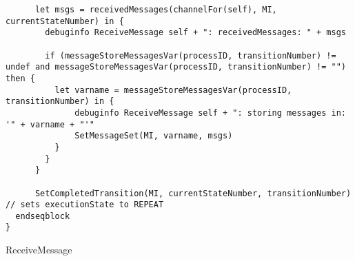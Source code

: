 \begin{listing}[H]
\begin{verbatim}
      let msgs = receivedMessages(channelFor(self), MI, currentStateNumber) in {
        debuginfo ReceiveMessage self + ": receivedMessages: " + msgs

        if (messageStoreMessagesVar(processID, transitionNumber) != undef and messageStoreMessagesVar(processID, transitionNumber) != "") then {
          let varname = messageStoreMessagesVar(processID, transitionNumber) in {
              debuginfo ReceiveMessage self + ": storing messages in: '" + varname + "'"
              SetMessageSet(MI, varname, msgs)
          }
        }
      }

      SetCompletedTransition(MI, currentStateNumber, transitionNumber) // sets executionState to REPEAT
  endseqblock
}
\end{verbatim}
\caption{ReceiveMessage}
\label{lst:asm:ReceiveMessage}
\end{listing}




